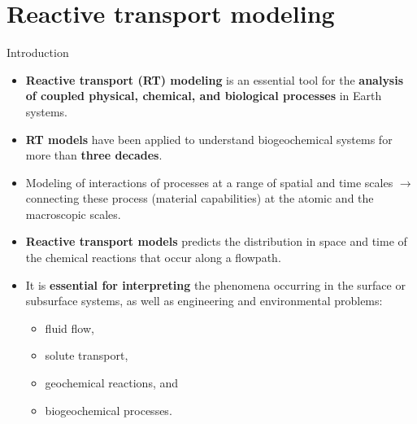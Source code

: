 \section{Reactive transport modeling}
%
%
\begin{frame}{Introduction}
	\vskip 10pt
	\begin{itemize}
		\item \alert{\bf Reactive transport (RT) modeling} is an essential tool for the {\bf analysis of coupled physical, chemical, and biological processes} in Earth systems.
		\item \alert{\bf RT models} have been applied to understand biogeochemical systems for more than {\bf three decades}.
		\item Modeling of interactions of processes at a range of spatial and time scales $\rightarrow$ connecting these process (material capabilities) at the atomic and the macroscopic scales.
		\item  \alert{\bf Reactive transport models} predicts the distribution in space and time of the chemical reactions that occur along a flowpath.
		\item It is {\bf essential for interpreting}
		the phenomena occurring in the surface or subsurface systems, as well as engineering and environmental problems:
		\begin{itemize}
			\item fluid flow, 
			\item solute transport, 
			\item geochemical reactions, and 
			\item biogeochemical processes. 
		\end{itemize}
	\end{itemize}
\end{frame}
%
%

